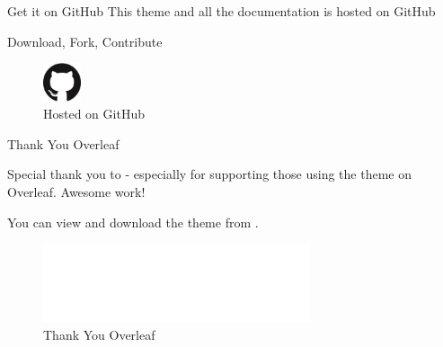 \documentclass[newPxFont,numfooter,sectionpages]{beamer}
\begin{document}

\begin{frame}[c]{Get it on GitHub}
This theme and all the documentation is hosted on GitHub \\
\vspace{1em}
\begin{center}
\large{Download, Fork, Contribute}

\vspace{1em}

\begin{figure}
	\centerline{\includegraphics[width=0.1\textwidth]{GitHub-Mark-120px-plus.png}}
\caption{Hosted on GitHub}
\end{figure}

\end{center}
\end{frame}

\begingroup
{}
\begin{frame}{Thank You Overleaf}

Special thank you to  - especially  for supporting those using the theme on Overleaf. Awesome work!

\vspace{1em}

You can view and download the theme from .

\begin{center}
\end{center}

\begin{figure}
	\centerline{\includegraphics[width=0.7\textwidth]{overleaf.png}}
\caption{Thank You Overleaf}
\end{figure}


\end{frame}
\endgroup
\end{document}
